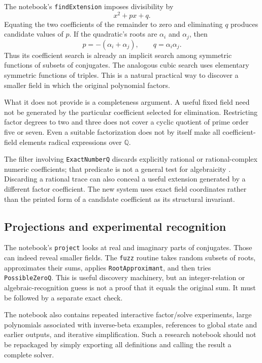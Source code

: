 \documentclass[11pt]{article}
\theoremstyle{definition}\newtheorem{definition}[theorem]{Definition}
\theoremstyle{remark}\newtheorem{remark}[theorem]{Remark}
\newcommand{\Q}{\mathbb Q}\newcommand{\C}{\mathbb C}\newcommand{\Z}{\mathbb Z}
\newcommand{\code}[1]{\texttt{#1}}
\begin{document}
The notebook's \code{findExtension} imposes divisibility by
\begin{equation}\label{eq:quadraticfactor}
 x^2+p x+q.
\end{equation}
Equating the two coefficients of the remainder to zero and eliminating $q$
produces candidate values of $p$. If the quadratic's roots are $\alpha_i$ and
$\alpha_j$, then
\begin{equation}
 p=-(\alpha_i+\alpha_j),\qquad q=\alpha_i\alpha_j.
\end{equation}
Thus its coefficient search is already an implicit search among symmetric
functions of subsets of conjugates. The analogous cubic search uses elementary
symmetric functions of triples. This is a natural practical way to discover a
smaller field in which the original polynomial factors.

What it does not provide is a completeness argument. A useful fixed field need
not be generated by the particular coefficient selected for elimination.
Restricting factor degrees to two and three does not cover a cyclic quotient of
prime order five or seven. Even a suitable factorization does not by itself
make all coefficient-field elements radical expressions over $\Q$.

The filter involving \code{ExactNumberQ} discards explicitly rational or
rational-complex numeric coefficients; that predicate is not a general test
for algebraicity \cite{wolfram-exact}. Discarding a rational trace can also
conceal a useful extension generated by a different factor coefficient.
The new system uses exact field coordinates rather than the printed form of a
candidate coefficient as its structural invariant.

\subsection{Projections and experimental recognition}

The notebook's \code{project} looks at real and imaginary parts of conjugates.
Those can indeed reveal smaller fields. The \code{fuzz} routine takes random
subsets of roots, approximates their sums, applies \code{RootApproximant}, and
then tries \code{PossibleZeroQ}. This is useful discovery machinery, but an
integer-relation or algebraic-recognition guess is not a proof that it equals
the original sum. It must be followed by a separate exact check.

The notebook also contains repeated interactive factor/solve experiments,
large polynomials associated with inverse-beta examples, references to global
state and earlier outputs, and iterative simplification. Such a research
notebook should not be repackaged by simply exporting all definitions and
calling the result a complete solver.
\end{document}
